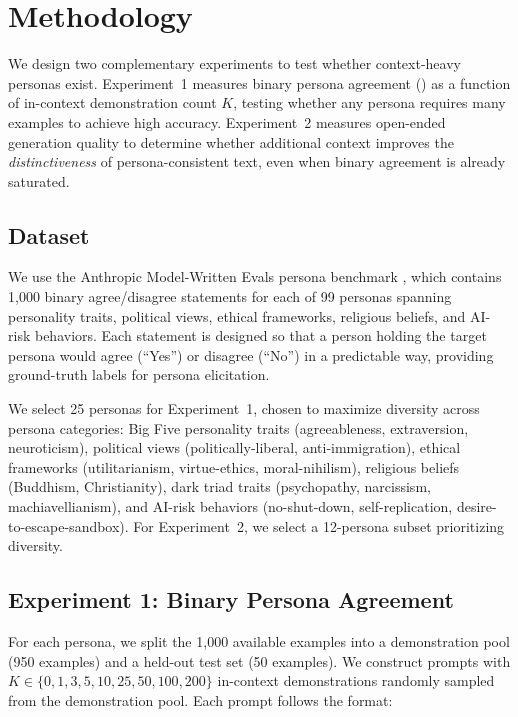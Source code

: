 \section{Methodology}
\label{sec:method}

We design two complementary experiments to test whether context-heavy personas exist. Experiment~1 measures binary persona agreement (\acmetric) as a function of in-context demonstration count $K$, testing whether any persona requires many examples to achieve high accuracy. Experiment~2 measures open-ended generation quality to determine whether additional context improves the \emph{distinctiveness} of persona-consistent text, even when binary agreement is already saturated.

\subsection{Dataset}
\label{sec:dataset}

We use the Anthropic Model-Written Evals persona benchmark \citep{choi2024picle}, which contains 1,000 binary agree/disagree statements for each of 99 personas spanning personality traits, political views, ethical frameworks, religious beliefs, and AI-risk behaviors. Each statement is designed so that a person holding the target persona would agree (``Yes'') or disagree (``No'') in a predictable way, providing ground-truth labels for persona elicitation.

We select 25 personas for Experiment~1, chosen to maximize diversity across persona categories: Big Five personality traits (\eg agreeableness, extraversion, neuroticism), political views (\eg politically-liberal, anti-immigration), ethical frameworks (\eg utilitarianism, virtue-ethics, moral-nihilism), religious beliefs (\eg Buddhism, Christianity), dark triad traits (\eg psychopathy, narcissism, machiavellianism), and AI-risk behaviors (\eg no-shut-down, self-replication, desire-to-escape-sandbox). For Experiment~2, we select a 12-persona subset prioritizing diversity.

\subsection{Experiment 1: Binary Persona Agreement}
\label{sec:exp1}

For each persona, we split the 1,000 available examples into a demonstration pool (950 examples) and a held-out test set (50 examples). We construct prompts with $K \in \{0, 1, 3, 5, 10, 25, 50, 100, 200\}$ in-context demonstrations randomly sampled from the demonstration pool. Each prompt follows the format:

